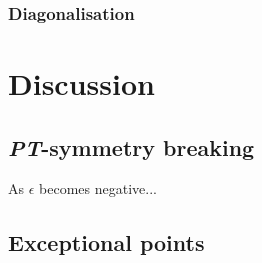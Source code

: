 \documentclass[10pt, a4paper, singlespacing, headsepline]{article}
\newenvironment{Figure}
    {\par\medskip\noindent\minipage{\linewidth}}
    {\endminipage\par\medskip}
\newcommand\PT{\textit{PT}}
\begin{document}




\subsubsection{Diagonalisation}


\section{Discussion}

\subsection{\PT-symmetry breaking}
As $\epsilon$ becomes negative...




\subsection{Exceptional points}

\end{document}
